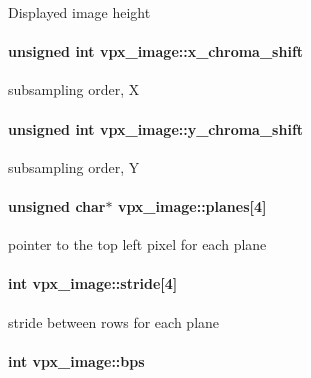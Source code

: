 Displayed image height \hypertarget{structvpx__image_affaf210489dcefebd90b87fd5f12dc0b}{
\paragraph[{x\-\_\-chroma\-\_\-shift}]{\setlength{\rightskip}{0pt plus 5cm}unsigned int vpx\-\_\-image\-::x\-\_\-chroma\-\_\-shift}}\label{structvpx__image_affaf210489dcefebd90b87fd5f12dc0b}
subsampling order, X \hypertarget{structvpx__image_a1e3d9b699d46ca32e3916d1ac635a4a2}{
\paragraph[{y\-\_\-chroma\-\_\-shift}]{\setlength{\rightskip}{0pt plus 5cm}unsigned int vpx\-\_\-image\-::y\-\_\-chroma\-\_\-shift}}\label{structvpx__image_a1e3d9b699d46ca32e3916d1ac635a4a2}
subsampling order, Y \hypertarget{structvpx__image_ab6258308ba7a5f4a113348120e20e2ce}{
\paragraph[{planes}]{\setlength{\rightskip}{0pt plus 5cm}unsigned char$\ast$ vpx\-\_\-image\-::planes\mbox{[}4\mbox{]}}}\label{structvpx__image_ab6258308ba7a5f4a113348120e20e2ce}
pointer to the top left pixel for each plane \hypertarget{structvpx__image_ac9c7b83e3eea44cb680956f90dc789cf}{
\paragraph[{stride}]{\setlength{\rightskip}{0pt plus 5cm}int vpx\-\_\-image\-::stride\mbox{[}4\mbox{]}}}\label{structvpx__image_ac9c7b83e3eea44cb680956f90dc789cf}
stride between rows for each plane \hypertarget{structvpx__image_a53a02fad822151eb8eeb2f64f195e1f6}{
\paragraph[{bps}]{\setlength{\rightskip}{0pt plus 5cm}int vpx\-\_\-image\-::bps}}\label{structvpx__image_a53a02fad822151eb8eeb2f64f195e1f6}
